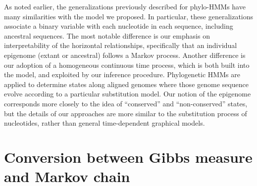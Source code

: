 \documentclass[11pt]{article}
\begin{document}
As noted earlier, the generalizations previously described for
phylo-HMMs have many similarities with the model we proposed. In
particular, these generalizations associate a binary variable with
each nucleotide in each sequence, including ancestral sequences.  The
most notable difference is our emphasis on interpretability of the
horizontal relationships, specifically that an individual epigenome
(extant or ancestral) follows a Markov process. Another difference is
our adoption of a homogeneous continuous time process, which is both
built into the model, and exploited by our inference
procedure. Phylogenetic HMMs are applied to determine states along
aligned genomes where those genome sequence evolve according to a
particular substitution model. Our notion of the epigenome corresponds
more closely to the idea of ``conserved'' and ``non-conserved''
states, but the details of our approaches are more similar to the
substitution process of nucleotides, rather than general
time-dependent graphical models.

\clearpage




\clearpage

\appendix
\section{Conversion between Gibbs measure  and Markov chain}
\end{document}
